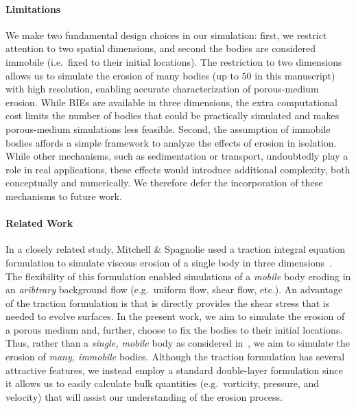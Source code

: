 \documentclass[preprint, 10pt]{elsarticle}
\begin{document}
\paragraph{Limitations}
We make two fundamental design choices in our simulation: first, we restrict attention to two spatial dimensions, and second the bodies are considered immobile (i.e.~fixed to their initial locations). The restriction to two dimensions allows us to simulate the erosion of many bodies (up to $50$ in this manuscript) with high resolution, enabling accurate characterization of porous-medium erosion. While BIEs are available in three dimensions, the extra computational cost limits the number of bodies that could be practically simulated and makes porous-medium simulations less feasible. Second, the assumption of immobile bodies affords a simple framework to analyze the effects of erosion in isolation. While other mechanisms, such as sedimentation or transport, undoubtedly play a role in real applications, these effects would introduce additional complexity, both conceptually and numerically. We therefore defer the incorporation of these mechanisms to future work.

\paragraph{Related Work}
In a closely related study, Mitchell \& Spagnolie used a traction integral equation formulation to simulate viscous erosion of a single body in three dimensions~\cite{mit-spa2016}. The flexibility of this formulation enabled simulations of a {\em mobile} body eroding in an {\em aribtrary} background flow (e.g.~uniform flow, shear flow, etc.).  An advantage of the traction formulation is that is directly provides the shear stress that is needed to evolve surfaces.  In the present work, we aim to simulate the erosion of a porous medium and, further, choose to fix the bodies to their initial locations. Thus, rather than a {\em single, mobile} body as considered in~\cite{mit-spa2016}, we aim to simulate the erosion of {\em many, immobile} bodies. Although the traction formulation has several attractive features, we instead employ a standard double-layer formulation since it allows us to easily calculate bulk quantities (e.g.~vorticity, pressure, and velocity) that will assist our understanding of the erosion process.
\end{document}

